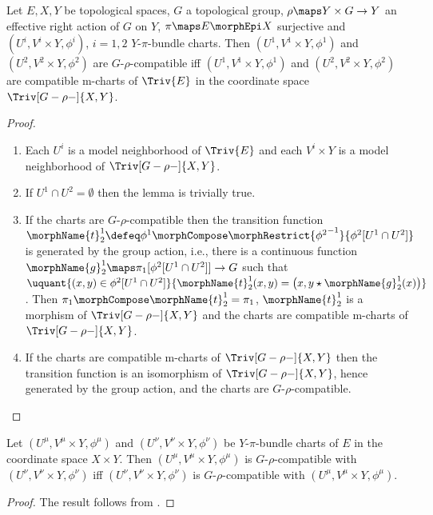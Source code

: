 \documentclass{article}
\begin{document}
\begin{lemma}
\label{lem:Grho-compat}
Let $E,X,Y$ be topological spaces, $G$ a topological group,
$\rho \maps Y \times G \to Y$ an effective right action of
$G$ on $Y$, $\pi \maps E \morphEpi X$ surjective
and $(U^i, V^i \times Y, \phi^i)$, $i =1,2$ $Y$-$\pi$-bundle charts.
Then $(U^1, V^1 \times Y, \phi^1)$ and
$(U^2, V^2 \times Y, \phi^2)$ are $G$-$\rho$-compatible iff
$(U^1, V^1 \times Y, \phi^1)$ and
$(U^2, V^2 \times Y, \phi^2)$ are compatible m-charts of
$\Triv{E}$ in the coordinate space
$\Triv[G-\rho-]{X,Y}$.

\begin{proof}
\begin{enumerate}
\leavevmode
\item
Each $U^i$ is a model neighborhood of $\Triv{E}$ and each $V^i \times Y$
is a model neighborhood of $\Triv[G-\rho-]{X,Y}$.

\item
If $U^1 \cap U^2 = \emptyset$ then the lemma is trivially true.

\item
If the charts are $G$-$\rho$-compatible then the transition function
$
  \morphName{t}^1_2 \defeq
    \phi^1 \morphCompose
    \morphRestrict{{\phi^2}^{-1}}{\phi^2[U^1 \cap U^2]}
$
is generated by the group action, i.e., there is a continuous function
$\morphName{g}^1_2 \maps \pi_1[\phi^2[U^1 \cap U^2]] \to G$
such that
$
  \uquant
    {{(x,y) \in \phi^2[U^1 \cap U^2]}}
    {
      \morphName{t}^1_2(x,y) =
      \bigl ( x, y \star \morphName{g}^1_2(x) \bigr )
    }
$.
Then $\pi_1 \morphCompose \morphName{t}^1_2 = \pi_1$, $\morphName{t}^1_2$ is a
morphism of $\Triv[G-\rho-]{X,Y}$ and the charts are compatible m-charts
of $\Triv[G-\rho-]{X,Y}$.

\item
If the charts are compatible m-charts of $\Triv[G-\rho-]{X,Y}$ then the
transition function is an isomorphism of $\Triv[G-\rho-]{X,Y}$, hence
generated by the group action, and the charts are $G$-$\rho$-compatible.
\end{enumerate}
\end{proof}
\end{lemma}

\begin{corollary}
\label{cor:Grho-compatsym}
Let $(U^\mu, V^\mu \times Y, \phi^\mu)$ and \linebreak
$(U^\nu, V^\nu \times Y, \phi^\nu)$ be $Y$-$\pi$-bundle charts of $E$ in the
coordinate space $X \times Y$. Then
$(U^\mu, V^\mu \times Y, \phi^\mu)$ is $G$-$\rho$-compatible with
$(U^\nu, V^\nu \times Y, \phi^\nu)$ iff
$(U^\nu, V^\nu \times Y, \phi^\nu)$ is $G$-$\rho$-compatible with
$(U^\mu, V^\mu \times Y, \phi^\mu)$.
\begin{proof}
The result follows from .
\end{proof}
\end{corollary}
\end{document}
